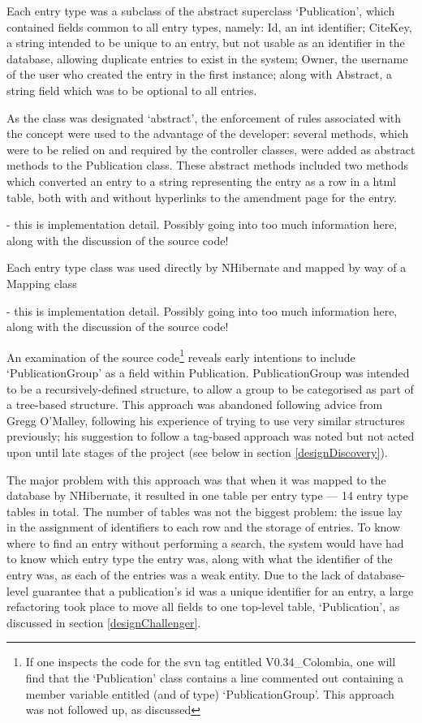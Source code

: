 Each entry type was a subclass of the abstract superclass `Publication', which contained fields common to all entry types, namely: Id, an int identifier; CiteKey, a string intended to be unique to an entry, but not usable as an identifier in the database, allowing duplicate entries to exist in the system; Owner, the username of the user who created the entry in the first instance; along with Abstract, a string field which was to be optional to all entries.

As the class was designated `abstract', the enforcement of rules associated with the concept were used to the advantage of the developer: several methods, which were to be relied on and required by the controller classes, were added as abstract methods to the Publication class.  These abstract methods included two methods which converted an entry to a string representing the entry as a row in a \gls{html} table, both with and without hyperlinks to the amendment page for the entry.

\revisit - this is implementation detail. Possibly going into too much information here, along with the discussion of the source code!

Each entry type class was used directly by NHibernate and mapped by way of a Mapping class 

\revisit - this is implementation detail. Possibly going into too much information here, along with the discussion of the source code!

An examination of the source code\footnote{If one inspects the code for the \gls{svn} tag entitled V0.34\_Colombia, one will find that the `Publication' class contains a line commented out containing a member variable entitled (and of type) `PublicationGroup'.  This approach was not followed up, as discussed} reveals early intentions to include `PublicationGroup' as a field within Publication.  PublicationGroup was intended to be a recursively-defined structure, to allow a group to be categorised as part of a tree-based structure.  This approach was abandoned following advice from Gregg O'Malley, following his experience of trying to use very similar structures previously; his suggestion to follow a tag-based approach was noted but not acted upon until late stages of the project (see below in section \ref{designDiscovery}).

The major problem with this approach was that when it was mapped to the database by NHibernate, it resulted in one table per entry type --- 14 entry type tables in total.  The number of tables was not the biggest problem: the issue lay in the assignment of identifiers to each row and the storage of entries.  To know where to find an entry without performing a search, the system would have had to know which entry type the entry was, along with what the identifier of the entry was, as each of the entries was a weak entity.  Due to the lack of database-level guarantee that a publication's id was a unique identifier for an entry, a large refactoring took place to move all fields to one top-level table, `Publication', as discussed in section \ref{designChallenger}.

